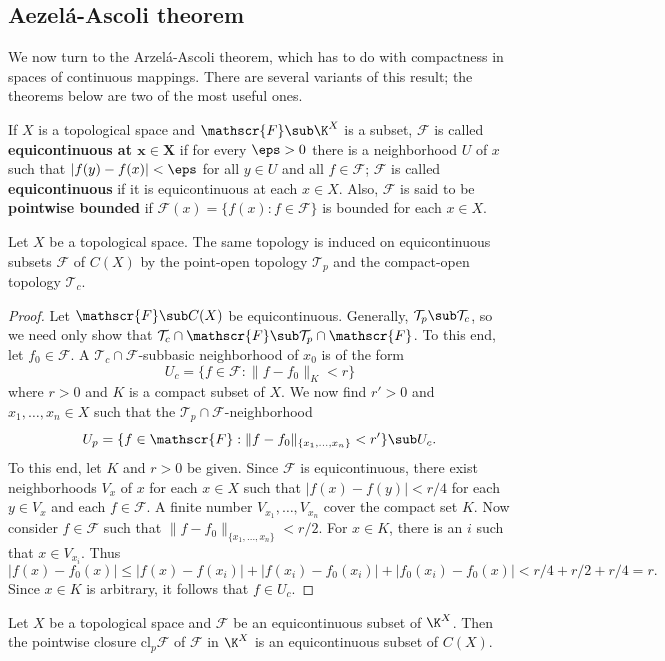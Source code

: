 \subsection{Aezel\'a-Ascoli theorem}
We now turn to the Arzel\'a-Ascoli theorem, which has to do with compactness in spaces of continuous mappings. There are several variants of this result; the theorems below are two of the most useful ones.\par
If $X$ is a topological space and $\mathscr{F}\sub\K^X$ is a subset, $\mathscr{F}$ is called \textbf{equicontinuous at $\bm{x\in X}$} if for every $\eps>0$ there is a neighborhood $U$ of $x$ such that $|f(y)-f(x)|<\eps$ for all $y\in U$ and all $f\in \mathscr{F}$; $\mathscr{F}$ is called \textbf{equicontinuous} if it is equicontinuous at each $x\in X$. Also, $\mathscr{F}$ is said to be \textbf{pointwise bounded} if $\mathscr{F}(x)=\{f(x):f\in\mathscr{F}\}$ is bounded for each $x\in X$.
\begin{lemma}\label{equicontinuous point-open iff compact-open}
Let $X$ be a topological space. The same topology is induced on equicontinuous subsets $\mathscr{F}$ of $C(X)$ by the point-open topology $\mathcal{T}_p$ and the compact-open topology $\mathcal{T}_c$.
\end{lemma}
\begin{proof}
Let $\mathscr{F}\sub C(X)$ be equicontinuous. Generally, $\mathcal{T}_p\sub\mathcal{T}_c$, so we need only show that $\mathcal{T}_c\cap\mathscr{F}\sub\mathcal{T}_p\cap\mathscr{F}$. To this end, let $f_0\in\mathscr{F}$. A $\mathcal{T}_c\cap \mathscr{F}$-subbasic neighborhood of $x_0$ is of the form
\[U_c=\{f\in \mathscr{F}:\|f-f_0\|_K<r\}\]
where $r>0$ and $K$ is a compact subset of $X$. We now find $r'>0$ and $x_1,\dots,x_n\in X$ such that the $\mathcal{T}_p\cap \mathscr{F}$-neighborhood
\[U_p=\{f\in \mathscr{F}:\|f-f_0\|_{\{x_1,\dots,x_n\}}<r'\}\sub U_c.\]
To this end, let $K$ and $r>0$ be given. Since $\mathscr{F}$ is equicontinuous, there exist neighborhoods $V_x$ of $x$ for each $x\in X$ such that $|f(x)-f(y)|<r/4$ for each $y\in V_x$ and each $f\in \mathscr{F}$. A finite number $V_{x_1},\dots,V_{x_n}$ cover the compact set $K$. Now consider $f\in \mathscr{F}$ such that $\|f-f_0\|_{\{x_1,\dots,x_n\}}<r/2$. For $x\in K$, there is an $i$ such that $x\in V_{x_i}$. Thus
\[|f(x)-f_0(x)|\leq |f(x)-f(x_i)|+|f(x_i)-f_0(x_i)|+|f_0(x_i)-f_0(x)|<r/4+r/2+r/4=r.\]
Since $x\in K$ is arbitrary, it follows that $f\in U_c$.
\end{proof}
\begin{lemma}\label{equicontinuous pointwise closure}
Let $X$ be a topological space and $\mathscr{F}$ be an equicontinuous subset of $\K^X$. Then the pointwise closure $\mathrm{cl}_p\mathscr{F}$ of $\mathscr{F}$ in $\K^X$ is an equicontinuous subset of $C(X)$.
\end{lemma}
